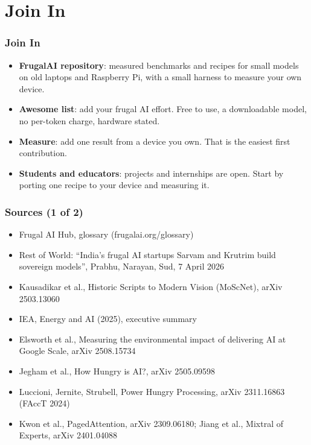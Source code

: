 
\section[Join]{Join In}

\begin{frame}[fragile]\frametitle{Join In}
\begin{itemize}
\item \textbf{FrugalAI repository}: measured benchmarks and recipes for small models on old laptops and Raspberry Pi, with a small harness to measure your own device.
\item \textbf{Awesome list}: add your frugal AI effort. Free to use, a downloadable model, no per-token charge, hardware stated.
\item \textbf{Measure}: add one result from a device you own. That is the easiest first contribution.
\item \textbf{Students and educators}: projects and internships are open. Start by porting one recipe to your device and measuring it.
\end{itemize}
\end{frame}

\begin{frame}[fragile]\frametitle{Sources (1 of 2)}
\begin{itemize}\footnotesize
\item Frugal AI Hub, glossary (frugalai.org/glossary)
\item Rest of World: ``India's frugal AI startups Sarvam and Krutrim build sovereign models'', Prabhu, Narayan, Sud, 7 April 2026
\item Kausadikar et al., Historic Scripts to Modern Vision (MoScNet), arXiv 2503.13060
\item IEA, Energy and AI (2025), executive summary
\item Elsworth et al., Measuring the environmental impact of delivering AI at Google Scale, arXiv 2508.15734
\item Jegham et al., How Hungry is AI?, arXiv 2505.09598
\item Luccioni, Jernite, Strubell, Power Hungry Processing, arXiv 2311.16863 (FAccT 2024)
\item Kwon et al., PagedAttention, arXiv 2309.06180; Jiang et al., Mixtral of Experts, arXiv 2401.04088
\end{itemize}
\end{frame}

